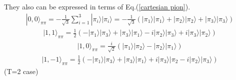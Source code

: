 \documentclass[aps,prd,preprintnumbers,showpacs,showkeys,nofootinbib,
superscriptaddress,fleqn,floatfix,tightenlines, 10pt]{revtex4-1}
\begin{document}
They also can be expressed in terms of Eq.(\ref{cartesian pion}).
\begin{align}
	|0,0\rangle_{\pi\pi} = -\frac{1}{\sqrt{3}} \sum_{i=1}^3 |\pi_i\rangle |\pi_i\rangle
	= -\frac{1}{\sqrt{3}} \left(|\pi_1\rangle |\pi_1\rangle + |\pi_2\rangle |\pi_2\rangle
	+|\pi_3\rangle |\pi_3\rangle \right)
\end{align}
\begin{align}
	|1,1\rangle_{\pi\pi} = \frac{1}{2} \left(-|\pi_1\rangle |\pi_3\rangle + |\pi_3\rangle |\pi_1\rangle
	-i|\pi_2\rangle |\pi_3\rangle +i|\pi_3\rangle |\pi_2\rangle  \right)
\end{align}
\begin{align}
	|1,0\rangle_{\pi\pi} = \frac{i}{\sqrt{2}} \left( |\pi_1\rangle |\pi_2\rangle
	-|\pi_2\rangle |\pi_1\rangle\right)
\end{align}
\begin{align}
	|1,-1\rangle_{\pi\pi} = \frac{1}{2} \left(-|\pi_1\rangle |\pi_3\rangle + |\pi_3\rangle |\pi_1\rangle
	+i|\pi_3\rangle |\pi_2 -i|\pi_2\rangle |\pi_3\rangle \right)
\end{align}
(T=2 case)
%
\end{document}
